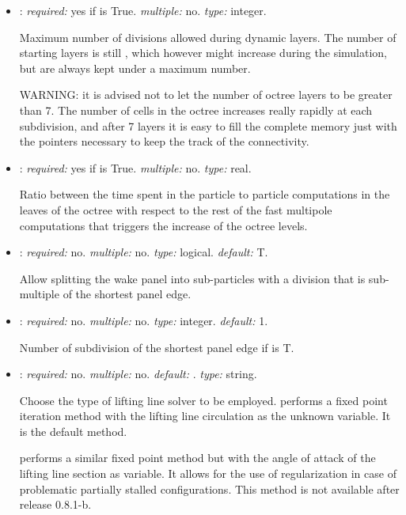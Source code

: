\begin{itemize}
\item {}: \textit{required:} yes if  is True. 
\textit{multiple:} no. \textit{type:} integer.

Maximum number of divisions allowed during dynamic layers. The number of starting 
layers is still , which however might increase during the 
simulation, but are always kept under a maximum number. 

WARNING: it is advised not to let the number of octree layers to be greater than 7. 
The number of cells in the octree increases really rapidly at each subdivision, 
and after 7 layers it is easy to fill the complete memory just with the pointers 
necessary to keep the track of the connectivity. 

\item {}: \textit{required:} yes if  is True. 
\textit{multiple:} no. \textit{type:} real.

Ratio between the time spent in the particle to particle computations in the 
leaves of the octree with respect to the rest of the fast multipole computations 
that triggers the increase of the octree levels.

\item {}: \textit{required:} no. 
\textit{multiple:} no. \textit{type:} logical. \textit{default:} T. 

Allow splitting the wake panel into sub-particles with a division that is sub-multiple of the shortest panel edge.   

\item {}: \textit{required:} no. \textit{multiple:} no. \textit{type:} integer. \textit{default:} 1. 

Number of subdivision of the shortest panel edge if  is T. 

\item {}: \textit{required:} no. \textit{multiple:} no. 
\textit{default:} . \textit{type:} string.

Choose the type of lifting line solver to be employed. 
 performs a fixed point iteration method with the lifting 
line circulation as the unknown variable. It is the default method. 

 performs a similar fixed point method but with the angle 
of attack of the lifting line section as variable. 
It allows for the use of regularization in case of problematic 
partially stalled configurations. This method is not available after release 0.8.1-b.


\end{itemize}
